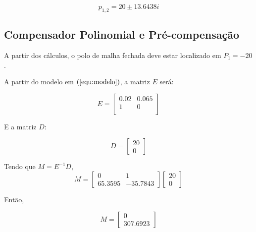 \documentclass[conference,harvard,brazil,english]{sbatex}
\begin{document}
            \begin{equation}
                p_{1,2} = 20 \pm 13.6438i
            \end{equation}
        
        \subsection{Compensador Polinomial e Pré-compensação}
        
        A partir dos cálculos, o polo de malha fechada deve estar localizado em $P_1 = -20$.
        
        A partir do modelo em $ \left( \ref{equ:modelo} \right)$, a matriz $E$ será:
        
        \begin{equation}
        \label{equ:matrizE}
        E= \begin{bmatrix}
        0.02 & 0.065 \\
        1 & 0 \\
        \end{bmatrix}
        \end{equation}
    
        E a matriz $D$:

        \begin{equation}
        \label{equ:matrizD}
        D = \begin{bmatrix}
        20 \\ 0
        \end{bmatrix}
        \end{equation}
        
        Tendo que $M = E^{-1}D$,
        $$
            M = \begin{bmatrix}
            0 & 1 \\ 65.3595 & -35.7843
            \end{bmatrix}
            \begin{bmatrix}
            20 \\ 0
            \end{bmatrix}
        $$
        
        Então,
        
        \begin{equation}
            \label{equ:matrizM}
            M = \begin{bmatrix}
            0 \\ 307.6923
            \end{bmatrix}
        \end{equation}
        
\end{document}
